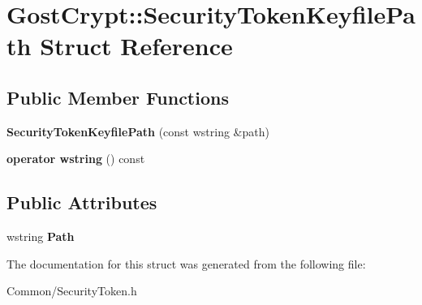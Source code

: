 \hypertarget{struct_gost_crypt_1_1_security_token_keyfile_path}{}\section{Gost\+Crypt\+:\+:Security\+Token\+Keyfile\+Path Struct Reference}
\label{struct_gost_crypt_1_1_security_token_keyfile_path}
\subsection*{Public Member Functions}
\begin{DoxyCompactItemize}
\item 
\mbox{\label{struct_gost_crypt_1_1_security_token_keyfile_path_ab8d79a2beaa805ebbe83c51c900a6e55}} 
{\bfseries Security\+Token\+Keyfile\+Path} (const wstring \&path)
\item 
\mbox{\label{struct_gost_crypt_1_1_security_token_keyfile_path_ab02040f8311a0f44e8cccf760aeaffa6}} 
{\bfseries operator wstring} () const
\end{DoxyCompactItemize}
\subsection*{Public Attributes}
\begin{DoxyCompactItemize}
\item 
\mbox{\label{struct_gost_crypt_1_1_security_token_keyfile_path_a9642bd96bee28066d92216512dfd169d}} 
wstring {\bfseries Path}
\end{DoxyCompactItemize}


The documentation for this struct was generated from the following file\+:\begin{DoxyCompactItemize}
\item 
Common/Security\+Token.\+h\end{DoxyCompactItemize}
